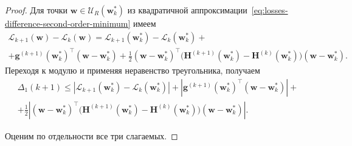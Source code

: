 \begin{proof}
    Для точки $\mathbf w \in \mathcal U_R(\mathbf w_k^*)$ из квадратичной
    аппроксимации~\eqref{eq:losses-difference-second-order-minimum} имеем
    \begin{multline}
        \mathcal L_{k+1}(\mathbf w)-\mathcal L_k(\mathbf w)
        =
        \mathcal L_{k+1}(\mathbf w_k^*)-\mathcal L_k(\mathbf w_k^*) 
        +
        \\
        +
        \mathbf g^{(k+1)}(\mathbf w_k^*)^\top(\mathbf w-\mathbf w_k^*)
        +
        \frac12
        (\mathbf w-\mathbf w_k^*)^\top
        \Big(
            \mathbf H^{(k+1)}(\mathbf w_k^*)
            -
            \mathbf H^{(k)}(\mathbf w_k^*)
        \Big)
        (\mathbf w-\mathbf w_k^*).
    \end{multline}
    Переходя к модулю и применяя неравенство треугольника, получаем
    \begin{multline}
        \Delta_1(k+1)
        \leqslant
        \left|
            \mathcal L_{k+1}(\mathbf w_k^*)
            -
            \mathcal L_k(\mathbf w_k^*)
        \right|
        +
        \left|
            \mathbf g^{(k+1)}(\mathbf w_k^*)^\top
            (\mathbf w-\mathbf w_k^*)
        \right|
        +
        \\
        +
        \frac12
        \left|
            (\mathbf w-\mathbf w_k^*)^\top
            \Big(
                \mathbf H^{(k+1)}(\mathbf w_k^*)
                -
                \mathbf H^{(k)}(\mathbf w_k^*)
            \Big)
            (\mathbf w-\mathbf w_k^*)
        \right|.
    \end{multline}

    Оценим по отдельности все три слагаемых.


\end{proof}
